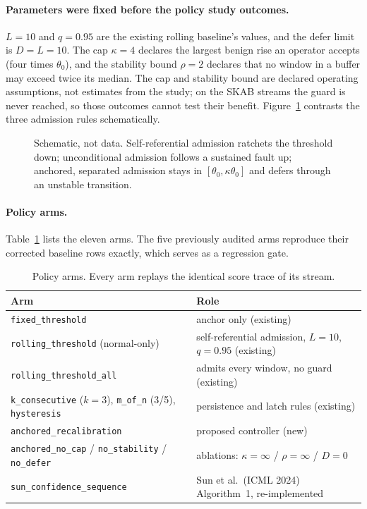 \paragraph{Parameters were fixed before the policy study outcomes.}
$L=10$ and $q=0.95$ are the existing rolling baseline's values, and the defer limit is
$D=L=10$. The cap $\kappa=4$ declares the largest benign rise an operator accepts (four
times $\theta_0$), and the stability bound $\rho=2$ declares that no window in a buffer
may exceed twice its median. The cap and stability bound are declared operating
assumptions, not estimates from the study; on the SKAB streams the guard is never
reached, so those outcomes cannot test their benefit.
Figure~\ref{fig:concept} contrasts the three admission rules schematically.

\begin{figure}[H]
  \centering
  \caption{Schematic, not data. Self-referential admission ratchets the threshold down;
  unconditional admission follows a sustained fault up; anchored, separated admission
  stays in $[\theta_0, \kappa\theta_0]$ and defers through an unstable transition.}
  \label{fig:concept}
\end{figure}

\paragraph{Policy arms.}
Table~\ref{tab:arms} lists the eleven arms. The five previously audited arms reproduce
their corrected baseline rows exactly, which serves as a regression gate.

\begin{table}[H]
  \centering
  \caption{Policy arms. Every arm replays the identical score trace of its stream.}
  \label{tab:arms}
  \small
  \begin{tabularx}{\linewidth}{@{}lX@{}}
    \toprule
    Arm & Role\\
    \midrule
    \texttt{fixed\_threshold} & anchor only (existing)\\
    \texttt{rolling\_threshold} (normal-only) & self-referential admission, $L{=}10$, $q{=}0.95$ (existing)\\
    \texttt{rolling\_threshold\_all} & admits every window, no guard (existing)\\
    \texttt{k\_consecutive} ($k{=}3$), \texttt{m\_of\_n} (3/5), \texttt{hysteresis} & persistence and latch rules (existing)\\
    \texttt{anchored\_recalibration} & proposed controller (new)\\
    \texttt{anchored\_no\_cap} / \texttt{no\_stability} / \texttt{no\_defer} & ablations: $\kappa{=}\infty$ / $\rho{=}\infty$ / $D{=}0$\\
    \texttt{sun\_confidence\_sequence} & Sun et al.\ (ICML 2024) Algorithm~1, re-implemented\\
    \bottomrule
  \end{tabularx}
\end{table}

